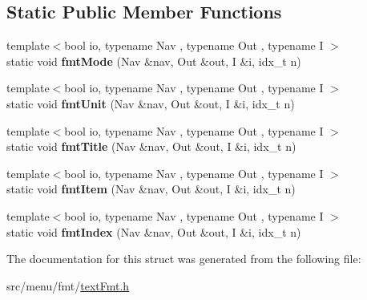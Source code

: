 \subsection*{Static Public Member Functions}
\begin{DoxyCompactItemize}
\item 
\mbox{\label{structTextFmt_a5f1cbec0608bca7db5f489239c041f9e}} 
{\footnotesize template$<$bool io, typename Nav , typename Out , typename I $>$ }\\static void {\bfseries fmt\+Mode} (Nav \&nav, Out \&out, I \&i, idx\+\_\+t n)
\item 
\mbox{\label{structTextFmt_a3e8f61c8e76fee55fa6f21cd5f95b57d}} 
{\footnotesize template$<$bool io, typename Nav , typename Out , typename I $>$ }\\static void {\bfseries fmt\+Unit} (Nav \&nav, Out \&out, I \&i, idx\+\_\+t n)
\item 
\mbox{\label{structTextFmt_ada6a9b8c051e2510f81b435cc43f5a71}} 
{\footnotesize template$<$bool io, typename Nav , typename Out , typename I $>$ }\\static void {\bfseries fmt\+Title} (Nav \&nav, Out \&out, I \&i, idx\+\_\+t n)
\item 
\mbox{\label{structTextFmt_a639276039aced38f5f23cfb98d7acfb6}} 
{\footnotesize template$<$bool io, typename Nav , typename Out , typename I $>$ }\\static void {\bfseries fmt\+Item} (Nav \&nav, Out \&out, I \&i, idx\+\_\+t n)
\item 
\mbox{\label{structTextFmt_a809f84b0f9e6ed2fcc62cfa22185a6d0}} 
{\footnotesize template$<$bool io, typename Nav , typename Out , typename I $>$ }\\static void {\bfseries fmt\+Index} (Nav \&nav, Out \&out, I \&i, idx\+\_\+t n)
\end{DoxyCompactItemize}


The documentation for this struct was generated from the following file\+:\begin{DoxyCompactItemize}
\item 
src/menu/fmt/\hyperlink{textFmt_8h}{text\+Fmt.\+h}\end{DoxyCompactItemize}
